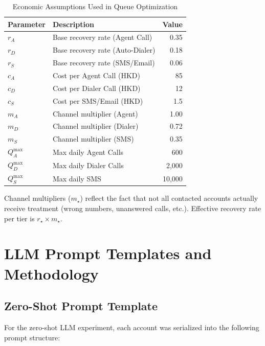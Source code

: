 \documentclass[12pt, a4paper]{article}
\begin{document}
\begin{table}[H]
\centering
\caption{Economic Assumptions Used in Queue Optimization}
\label{tab:econ_params}
\small
\begin{tabular}{@{}llr@{}}
\toprule
\textbf{Parameter} & \textbf{Description} & \textbf{Value}\\
\midrule
$r_A$ & Base recovery rate (Agent Call) & 0.35\\
$r_D$ & Base recovery rate (Auto-Dialer) & 0.18\\
$r_S$ & Base recovery rate (SMS/Email) & 0.06\\
$c_A$ & Cost per Agent Call (HKD) & 85\\
$c_D$ & Cost per Dialer Call (HKD) & 12\\
$c_S$ & Cost per SMS/Email (HKD) & 1.5\\
$m_A$ & Channel multiplier (Agent) & 1.00\\
$m_D$ & Channel multiplier (Dialer) & 0.72\\
$m_S$ & Channel multiplier (SMS) & 0.35\\
$Q_A^{\max}$ & Max daily Agent Calls & 600\\
$Q_D^{\max}$ & Max daily Dialer Calls & 2{,}000\\
$Q_S^{\max}$ & Max daily SMS & 10{,}000\\
\bottomrule
\end{tabular}
\end{table}

Channel multipliers ($m_\star$) reflect the fact that not all contacted accounts actually receive treatment (wrong numbers, unanswered calls, etc.). Effective recovery rate per tier is $r_\star \times m_\star$.


\section{LLM Prompt Templates and Methodology}\label{app:llm_prompts}

\subsection{Zero-Shot Prompt Template}

For the zero-shot LLM experiment, each account was serialized into the following prompt structure:
\end{document}
